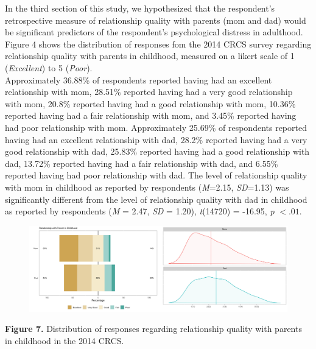 \documentclass[12pt,letterpaper]{article}
\begin{document}

In the third section of this study, we hypothesized that the respondent's retrospective measure of relationship quality with parents (mom and dad) would be significant predictors of the respondent's psychological distress in adulthood. Figure 4 shows the distribution of responses fom the 2014 CRCS survey regarding relationship quality with parents in childhood, measured on a likert scale of 1 (\textit {Excellent}) to 5 (\textit{Poor}). \\
\indent Approximately 36.88\% of respondents reported having had an excellent relationship with mom,  28.51\% reported having had a very good relationship with mom, 20.8\% reported having had a good relationship with mom, 10.36\% reported having had a fair relationship with mom, and 3.45\% reported having had poor relationship with mom. Approximately 25.69\% of respondents reported having had an excellent relationship with dad,  28.2\% reported having had a very good relationship with dad, 25.83\% reported having had a good relationship with dad, 13.72\% reported having had a fair relationship with dad, and 6.55\% reported having had poor relationship with dad. The level of relationship quality with mom in childhood as reported by respondents (\textit{M}=2.15, \textit{SD}=1.13) was significantly different from the level of relationship quality with dad in childhood as reported by respondents (\textit{M} = 2.47, \textit{SD} = 1.20), \textit{t}(14720) = -16.95, \textit{p} $<.01$.

\begin{figure}[H]
	\centering
	\includegraphics[scale=0.3]{likert3.png}
\end{figure}	

\begin{center}
	\singlespacing
	\textbf{Figure 7.} Distribution of responses regarding relationship quality with parents in childhood in the 2014 CRCS.
\end{center}
\end{document}
